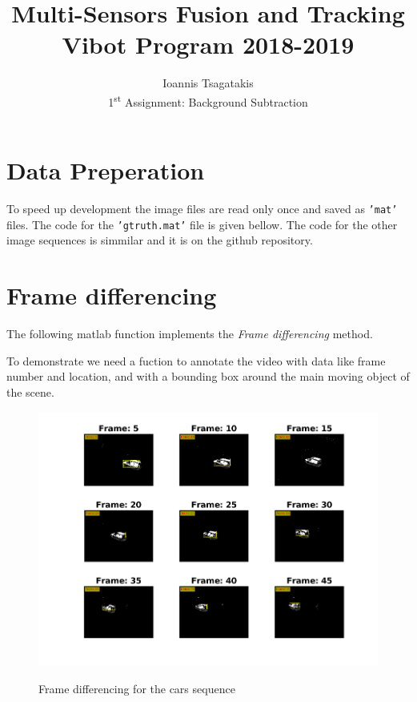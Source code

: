 \documentclass[a4paper,12pt]{article}
\begin{document}
\title{ Multi-Sensors Fusion and Tracking\\Vibot Program 2018-2019}
\author{Ioannis Tsagatakis\\
1\textsuperscript{st} Assignment: Background Subtraction} 
 
\maketitle

\section{Data Preperation}
To speed up development the image files are read only once and saved as \texttt{'mat'} files. The code for the \texttt{'gtruth.mat'} file is given bellow. The code for the other image sequences is simmilar and it is on the github repository.



\section{Frame differencing}
The following matlab function implements the \textit{Frame differencing} method.



To demonstrate we need a fuction to annotate the video with data like frame number and location, and with a bounding box around the main moving object of the scene.

\begin{figure}[Ht]
\centering
\includegraphics{../Videos/bgsub_framediff_cars.png}
\label{fig:fdiff_cars}
\caption{Frame differencing for the cars sequence}
\end{figure}
\end{document}
